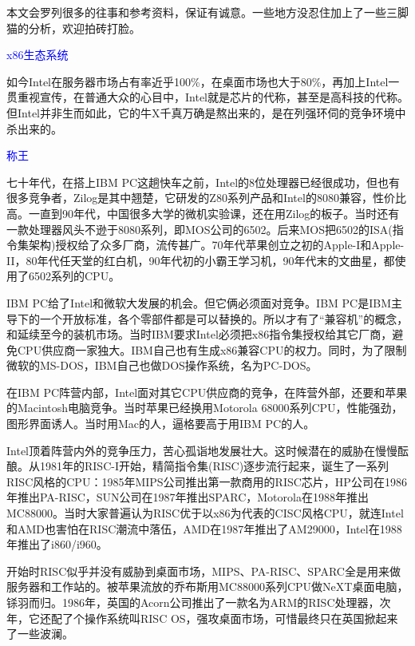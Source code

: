 \documentclass[utf8]{book}
\begin{document}
	本文会罗列很多的往事和参考资料，保证有诚意。一些地方没忍住加上了一些三脚猫的分析，欢迎拍砖打脸。
	
	\begin{flushleft}
		{\Large \textcolor{blue}{x86生态系统}}
	\end{flushleft}
	
	如今Intel在服务器市场占有率近乎100\%，在桌面市场也大于80\%，再加上Intel一贯重视宣传，在普通大众的心目中，Intel就是芯片的代称，甚至是高科技的代称。但Intel并非生而如此，它的牛X千真万确是熬出来的，是在列强环伺的竞争环境中杀出来的。
	
	\begin{flushleft}
		{\large \textcolor{blue}{称王}}
	\end{flushleft}
	
	
	七十年代，在搭上IBM PC这趟快车之前，Intel的8位处理器已经很成功，但也有很多竞争者，Zilog是其中翘楚，它研发的Z80系列产品和Intel的8080兼容，性价比高。一直到90年代，中国很多大学的微机实验课，还在用Zilog的板子。当时还有一款处理器风头不逊于8080系列，即MOS公司的6502。后来MOS把6502的ISA(指令集架构)授权给了众多厂商，流传甚广。70年代苹果创立之初的Apple-I和Apple-II，80年代任天堂的红白机，90年代初的小霸王学习机，90年代末的文曲星，都使用了6502系列的CPU。
	
	IBM PC给了Intel和微软大发展的机会。但它俩必须面对竞争。IBM PC是IBM主导下的一个开放标准，各个零部件都是可以替换的。所以才有了“兼容机”的概念，和延续至今的装机市场。当时IBM要求Intel必须把x86指令集授权给其它厂商，避免CPU供应商一家独大。IBM自己也有生成x86兼容CPU的权力。同时，为了限制微软的MS-DOS，IBM自己也做DOS操作系统，名为PC-DOS。
	
	在IBM PC阵营内部，Intel面对其它CPU供应商的竞争，在阵营外部，还要和苹果的Macintosh电脑竞争。当时苹果已经换用Motorola 68000系列CPU，性能强劲，图形界面诱人。当时用Mac的人，逼格要高于用IBM PC的人。
	
	Intel顶着阵营内外的竞争压力，苦心孤诣地发展壮大。这时候潜在的威胁在慢慢酝酿。从1981年的RISC-I开始，精简指令集(RISC)逐步流行起来，诞生了一系列RISC风格的CPU：1985年MIPS公司推出第一款商用的RISC芯片，HP公司在1986年推出PA-RISC，SUN公司在1987年推出SPARC，Motorola在1988年推出MC88000。当时大家普遍认为RISC优于以x86为代表的CISC风格CPU，就连Intel和AMD也害怕在RISC潮流中落伍，AMD在1987年推出了AM29000，Intel在1988年推出了i860/i960。
	
	
	开始时RISC似乎并没有威胁到桌面市场，MIPS、PA-RISC、SPARC全是用来做服务器和工作站的。被苹果流放的乔布斯用MC88000系列CPU做NeXT桌面电脑，铩羽而归。1986年，英国的Acorn公司推出了一款名为ARM的RISC处理器，次年，它还配了个操作系统叫RISC OS，强攻桌面市场，可惜最终只在英国掀起来了一些波澜。
	
\end{document}
